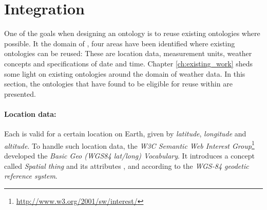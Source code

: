 \section{Integration}
\label{sec:integration}

One of the goals when designing an ontology is to reuse existing ontologies where possible\cite{reuse1}\cite{reuse2}. It the domain of \thinkhomeweather, four areas have been identified where existing ontologies can be reused: These are location data, measurement units, weather concepts and specifications of date and time. Chapter \ref{ch:existing_work} sheds some light on existing ontologies around the domain of weather data. In this section, the ontologies that have found to be eligible for reuse within \thinkhomeweather are presented.

\paragraph{Location data:}

Each  is valid for a certain location on Earth, given by \emph{latitude}, \emph{longitude} and \emph{altitude}. To handle such location data, the \emph{W3C Semantic Web Interest Group}\footnote{\href{http://www.w3.org/2001/sw/interest/}{http://www.w3.org/2001/sw/interest/}} developed the \emph{Basic Geo (WGS84 lat/long) Vocabulary}\cite{wgs84_vocabulary}. It introduces a concept called \emph{Spatial thing} and its attributes ,  and  according to the \emph{WGS-84 geodetic reference system}\cite{WGS84}.

